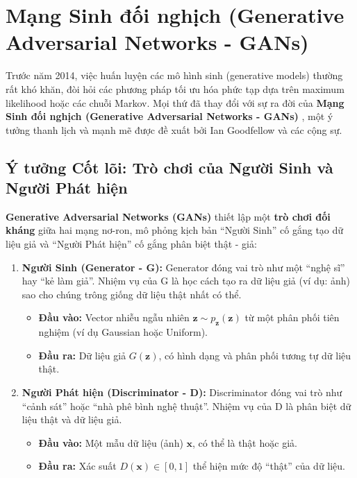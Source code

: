 \section{Mạng Sinh đối nghịch (Generative Adversarial Networks - GANs)}
\label{sec:gans}

Trước năm 2014, việc huấn luyện các mô hình sinh (generative models) thường rất khó khăn, đòi hỏi các phương pháp tối ưu hóa phức tạp dựa trên maximum likelihood hoặc các chuỗi Markov. Mọi thứ đã thay đổi với sự ra đời của \textbf{Mạng Sinh đối nghịch (Generative Adversarial Networks - GANs)} \cite{Goodfellow2014}, một ý tưởng thanh lịch và mạnh mẽ được đề xuất bởi Ian Goodfellow và các cộng sự.

\subsection{Ý tưởng Cốt lõi: Trò chơi của Người Sinh và Người Phát hiện}
\label{subsec:gan_core_idea}

\textbf{Generative Adversarial Networks (GANs)} thiết lập một \textbf{trò chơi đối kháng} giữa hai mạng nơ-ron, mô phỏng kịch bản “Người Sinh” cố gắng tạo dữ liệu giả và “Người Phát hiện” cố gắng phân biệt thật - giả:

\begin{enumerate}
	\item \textbf{Người Sinh (Generator - G):}  
	Generator đóng vai trò như một “nghệ sĩ” hay “kẻ làm giả”. Nhiệm vụ của G là học cách tạo ra dữ liệu giả (ví dụ: ảnh) sao cho chúng trông giống dữ liệu thật nhất có thể.  
	\begin{itemize}
		\item \textbf{Đầu vào:} Vector nhiễu ngẫu nhiên $\mathbf{z} \sim p_\mathbf{z}(\mathbf{z})$ từ một phân phối tiên nghiệm (ví dụ Gaussian hoặc Uniform).  
		\item \textbf{Đầu ra:} Dữ liệu giả $G(\mathbf{z})$, có hình dạng và phân phối tương tự dữ liệu thật.
	\end{itemize}
	
	\item \textbf{Người Phát hiện (Discriminator - D):}  
	Discriminator đóng vai trò như “cảnh sát” hoặc “nhà phê bình nghệ thuật”. Nhiệm vụ của D là phân biệt dữ liệu thật và dữ liệu giả.
	\begin{itemize}
		\item \textbf{Đầu vào:} Một mẫu dữ liệu (ảnh) $\mathbf{x}$, có thể là thật hoặc giả.  
		\item \textbf{Đầu ra:} Xác suất $D(\mathbf{x}) \in [0,1]$ thể hiện mức độ “thật” của dữ liệu.
	\end{itemize}
\end{enumerate}

